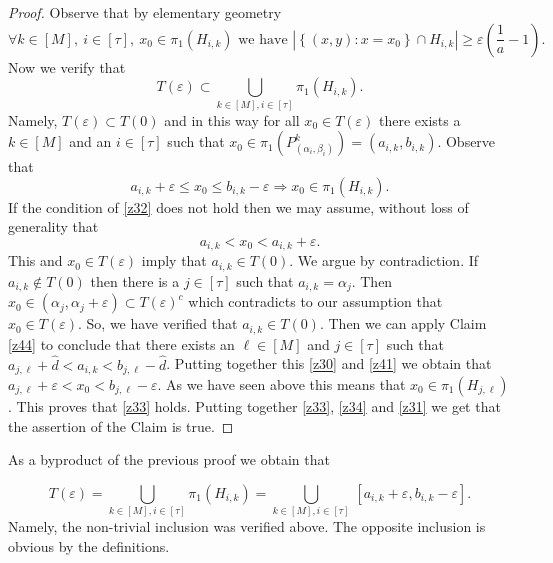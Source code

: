 \documentclass[amssymb,amsfonts,12pt,verbatim,righttag,oneside]{amsart}
\numberwithin{equation}{section} %
\theoremstyle{plain}
\newcommand{\fmu}{\ensuremath{\,}}
\theoremstyle{plain}
\begin{document}
\begin{proof}
Observe that by elementary geometry
\begin{equation}
\label{z34}
\forall k\in[M],\  i\in[\tau],\  x_0\in \pi _1(H_{i,k}) \text{ we have }
|\left\{ (x,y):x=x_0 \right\}\cap
H_{i,k}
|\geq \varepsilon \left( \frac{1}{a} -1\right).
\end{equation}
Now we verify that
\begin{equation}
\label{z33}
T(\varepsilon )\subset
\bigcup\limits_{k\in[M],i\in[\tau]}
\pi _1
\left(
 H_{i,k}
 \right).
\end{equation}
Namely, $T(\varepsilon )\subset T(0)$ and in this way
for all $x_0\in T(\varepsilon )$
there exists a
$k\in[M]$ and an $i\in[\tau]$ such that
$x_0\in \pi _1(P _{(\alpha_i,\beta _i)}^{ k})=(a_{i,k},b_{i,k})$. Observe that
\begin{equation}
\label{z32}
a_{i,k}+\varepsilon  \leq x_0 \leq  b_{i,k}-\varepsilon
\Longrightarrow
x_0\in\pi _1\left( H_{i,k} \right).
\end{equation}
If the condition of \eqref{z32} does not hold then we may assume, without loss of generality that
\begin{equation}
\label{z30}
a_{i,k}< x_0< a_{i,k}+\varepsilon.
\end{equation}
 This and $x_0\in T(\varepsilon )$ imply that $a_{i,k}\in T(0)$. We argue by contradiction. If
$a_{i,k}\not\in T(0)$
then there is a  $j\in [\tau]$ such that $a_{i,k}=\alpha _j$. Then
$x_0\in (\alpha _j,\alpha _j+\varepsilon )\subset T(\varepsilon )^c$ which contradicts to our assumption that $x_0\in T(\varepsilon )$. So, we have verified that $a_{i,k}\in T(0)$.  Then
we can apply Claim \ref{z44} to conclude that there exists an $\ell \in[M]$ and
$j\in[\tau]$ such that
 $a_{j,\ell }+\widehat{d} <a_{i,k}<b_{j,\ell }-\widehat{d} $. Putting together this \eqref{z30} and \eqref{z41} we obtain that
$a_{j,\ell }+\varepsilon <x_0< b_{j,\ell }-\varepsilon $. As we have seen above this means that $x_0\in \pi _1(H_{j,\ell })$. This proves that \eqref{z33} holds. {Putting together
\eqref{z33},
\eqref{z34} and \eqref{z31} we get that the assertion of the Claim is true.}
\end{proof}
As a byproduct of the previous proof we obtain that

\begin{equation}
\label{y65}
T(\varepsilon )= \bigcup\limits_{k\in[M],i\in[\tau]} \pi _1 \left( H_{i,k} \right) =
 \bigcup\limits_{k\in[M],i\in[\tau]} \fmu [a_{i,k}+\varepsilon ,b_{i,k}-\varepsilon ].
\end{equation}
Namely, the non-trivial inclusion was verified above. The opposite inclusion is obvious by the definitions.
\end{document}
